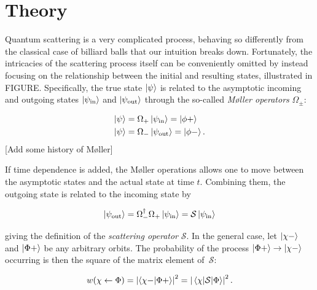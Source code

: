 \section{Theory}\label{sec:Theory}

\newcommand{\state}{\ket{\psi}}
\newcommand{\hoket}{\ket{\phi}}
\newcommand{\hoep}{\ket{\phi +}}
\newcommand{\hoem}{\ket{\phi -}}
\newcommand{\pin}{\psi_\text{in}}
\newcommand{\pout}{\psi_\text{out}}
\newcommand{\kpin}{\ket{\psi_\text{in}}}
\newcommand{\kpout}{\ket{\psi_\text{out}}}
\newcommand{\mop}{\Omega_{+}}
\newcommand{\mom}{\Omega_{-}}
\newcommand{\melt}[3]{\left|\mel{#1}{#2}{#3}\right|^{2}}
\newcommand{\scat}{\mathcal{S}}
\newcommand{\mscat}{\(\scat\)}
\newcommand{\oop}[1]{\mathcal{#1}}
\newcommand{\moop}[1]{\(\oop{#1}\)}
Quantum scattering is a very complicated process, behaving so differently from the
classical case of billiard balls that our intuition breaks down. Fortunately, the intricacies of
the scattering process itself can be conveniently omitted by instead focusing on
the relationship between the initial and resulting states, illustrated in FIGURE.
Specifically, the true state \(\ket{\psi}\) is related to the asymptotic
incoming and outgoing states \(\kpin\) and \(\kpout\) through the so-called
\textit{M\o ller operators} \(\Omega_{\pm}\):

\begin{align*}
  \state &= \mop\kpin = \hoep\\
  \state &= \mom\kpout = \hoem .
\end{align*}
[Add some history of Møller]

If time dependence is added, the M\o{}ller operations allows one to move between
the asymptotic states and the actual state at time \(t\).
Combining them, the outgoing state is related to the incoming state by

\begin{equation*}
  \kpout = \mom^{\dagger}\mop\kpin = \scat\kpin
\end{equation*}

giving the definition of the \textit{scattering operator} \mscat.
In the general case, let \(\ket{\chi -}\) and \(\ket{\Phi +}\) be any arbitrary
orbits. The probability of the process \(\ket{\Phi +}\to\ket{\chi -}\)
occurring is
then the square of the  matrix element of\ \mscat :

\begin{equation*}
  w(\chi \leftarrow \Phi) = \left| \ip{\chi -}{\Phi +} \right|^{2} = \melt{\chi}{\scat}{\Phi}.
\end{equation*}

